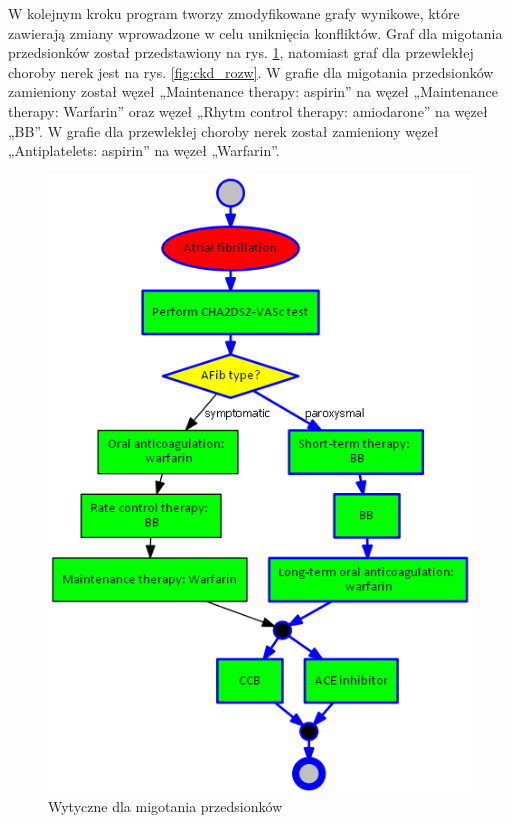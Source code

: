 W kolejnym kroku program tworzy zmodyfikowane grafy wynikowe, które zawierają zmiany wprowadzone w celu uniknięcia konfliktów. Graf dla migotania przedsionków został przedstawiony na rys. \ref{fig:afib_rozw}, natomiast graf dla przewlekłej choroby nerek jest na rys. \ref{fig:ckd_rozw}. W grafie dla migotania przedsionków zamieniony został węzeł „Maintenance therapy: aspirin” na węzeł „Maintenance therapy: Warfarin” oraz węzeł „Rhytm control therapy: amiodarone” na węzeł „BB”. W grafie dla przewlekłej choroby nerek został zamieniony węzeł „Antiplatelets: aspirin” na węzeł „Warfarin”.
\begin{figure}[H]
\centering
\includegraphics[scale=0.5]{img/rozwiazanie1afib-ver-4.png}
\caption{Wytyczne dla migotania przedsionków}
\label{fig:afib_rozw}
\end{figure}
